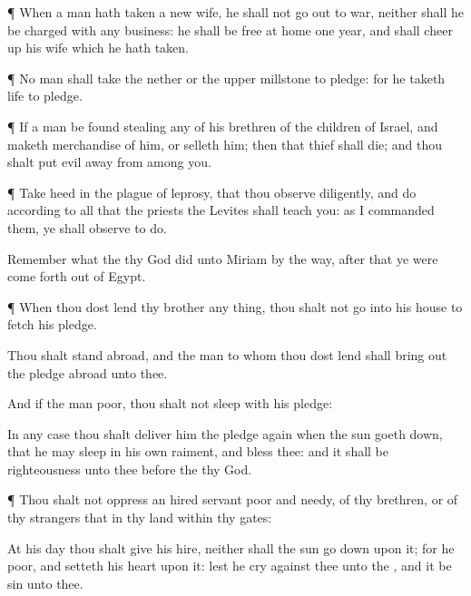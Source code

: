 {\par }{\PP {}¶ When a
man hath
taken a
new
wife, he shall not go
out to
war, neither shall he be
charged with any
business:
{} he shall be
free at
home
one
year, and shall cheer
up his
wife which he hath
taken.


\par }{\PP {}¶ No man shall
take the
nether or the upper
millstone to
pledge: for he
taketh
{}
life to
pledge.


\par }{\PP {}¶ If a
man be
found
stealing
any of his
brethren of the
children of
Israel, and maketh
merchandise of him, or
selleth him; then that
thief shall
die; and thou shalt
put
evil
away from
among you.


\par }{\PP {}¶ Take
heed in the
plague of
leprosy, that thou
observe
diligently, and
do according to all that the
priests the
Levites shall
teach you: as I
commanded them,
{} ye shall
observe to
do.

Remember what the
{} thy
God
did unto
Miriam by the
way, after that ye were come
forth out of
Egypt.


\par }{\PP {}¶ When thou dost
lend thy
brother
any
thing, thou shalt not
go into his
house to
fetch his
pledge.

Thou shalt
stand
abroad, and the
man to whom thou dost
lend shall bring
out the
pledge
abroad unto thee.

And if the
man
{}
poor, thou shalt not
sleep with his
pledge:

In any
case thou shalt
deliver him the
pledge
again when the
sun goeth
down, that he may
sleep in his own
raiment, and
bless thee: and it shall be
righteousness unto thee
before the
{} thy
God.


\par }{\PP {}¶ Thou shalt not
oppress an hired
servant
{}
poor and
needy,
{} of thy
brethren, or of thy
strangers that
{} in thy
land within thy
gates:

At his
day thou shalt
give
{} his
hire, neither shall the
sun go
down upon it; for he
{}
poor, and
setteth his
heart upon it: lest he
cry against thee unto the
{}, and it be
sin unto thee.

}
